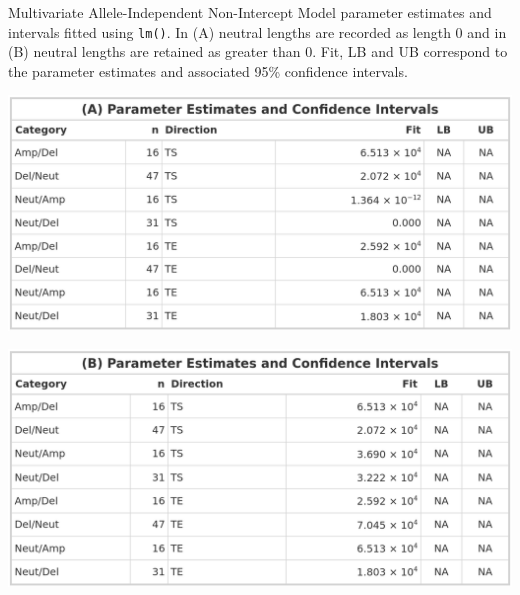 \begin{table}[H]
    \caption[Multivariate Allele-Independent Non-Intercept Model parameter estimates and intervals fitted using \texttt{lm()}.]{Multivariate Allele-Independent Non-Intercept Model parameter estimates and intervals fitted using \texttt{lm()}. In (A) neutral lengths are recorded as length 0 and in (B) neutral lengths are retained as greater than 0. Fit, LB and UB correspond to the parameter estimates and associated 95\% confidence intervals. }
    \label{tbl:lm_multi_2_pred}
     \begin{subtable}[t]{.49\textwidth}
      \centering
      \includegraphics[width = 1\textwidth]{../tables/Chapter_5/Multivariate_lm_6_AI_Pred.png}
    \end{subtable}%
    \hspace{0.5cm}
     \begin{subtable}[t]{.49\textwidth}
      \centering
         \includegraphics[width = 1\textwidth]{../tables/Chapter_5/Multivariate_lm_6_Neut_AI_Pred.png}
    \end{subtable} 
\end{table}

